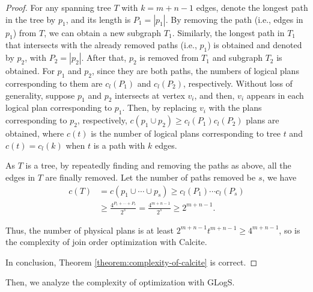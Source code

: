 \begin{proof}
    For any spanning tree $T$ with $k = m + n - 1$ edges, denote the longest path in the tree by $p_1$, and its length is $P_1 = |p_1|$.
    By removing the path (i.e., edges in $p_1$) from $T$, we can obtain a new subgraph $T_1$.
    Similarly, the longest path in $T_1$ that intersects with the already removed paths (i.e., $p_1$) is obtained and denoted by $p_2$, with $P_2 = |p_2|$.
    After that, $p_2$ is removed from $T_1$ and subgraph $T_2$ is obtained.
    For $p_1$ and $p_2$, since they are both paths, the numbers of logical plans corresponding to them are $c_l(P_1)$ and $c_l(P_2)$, respectively.
    Without loss of generality, suppose $p_1$ and $p_2$ intersects at vertex $v_i$, and then, $v_i$ appears in each logical plan corresponding to $p_1$.
    Then, by replacing $v_i$ with the plans corresponding to $p_2$, respectively, $c(p_1 \cup p_2) \geq c_l(P_1)c_l(P_2)$ plans are obtained, where $c(t)$ is the number of logical plans corresponding to tree $t$ and $c(t) = c_l(k)$ when $t$ is a path with $k$ edges.

    As $T$ is a tree, by repeatedly finding and removing the paths as above, all the edges in $T$ are finally removed.
    Let the number of paths removed be $s$, we have 
    \begin{equation*}
        \begin{split}
            c(T) & = c(p_1 \cup \cdots \cup p_s) \geq c_l(P_1) \cdots c_l(P_s) \\
            & \geq \frac{4^{P_1 + \cdots + P_s}}{2^s} = \frac{4^{m + n - 1}}{2^s} \geq 2^{m+n-1}.
        \end{split}
    \end{equation*}
    
    

    Thus, the number of physical plans is at least $2^{m+n-1}t^{m+n-1} \geq 4^{m+n-1}$, so is the complexity of join order optimization with Calcite.
   
    In conclusion, Theorem \ref{theorem:complexity-of-calcite} is correct.
\end{proof}

Then, we analyze the complexity of optimization with GLogS.


